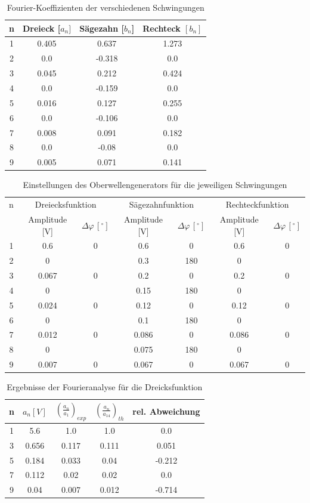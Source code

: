 \documentclass[11pt,ngerman,a4paper]{article}
\begin{document}
\newpage
\begin{table}
\centering
\begin{tabular}{|c|c|c|c|}

\hline
n & Dreieck [$a_n]$ & S\"agezahn [$b_n$] & Rechteck $[b_n]$ \\
\hline
1 & 0.405 & 0.637 & 1.273\\
2 & 0.0 & -0.318 & 0.0\\
3 & 0.045 & 0.212 & 0.424\\
4 & 0.0 & -0.159 & 0.0\\
5 & 0.016 & 0.127 & 0.255\\
6 & 0.0 & -0.106 & 0.0\\
7 & 0.008 & 0.091 & 0.182\\
8 & 0.0 & -0.08 & 0.0\\
9 & 0.005 & 0.071 & 0.141\\
\hline
\end{tabular}
\label{table1}
\caption{Fourier-Koeffizienten der verschiedenen Schwingungen}
\end{table}

\begin{table}
\centering
\begin{tabular}{|c||c|c||c|c||c|c|}
\hline
n & \multicolumn{2}{c||}{Dreiecksfunktion} & \multicolumn{2}{c||}{Sägezahnfunktion} & \multicolumn{2}{c|}{Rechteckfunktion} \\
 & Amplitude [V] & $\Delta \varphi\,[^\circ]$ & Amplitude [V] & $\Delta \varphi\,[^\circ]$ & Amplitude [V] & $\Delta \varphi\,[^\circ]$ \\
\hline
1 & 0.6 & 0 & 0.6 & 0 & 0.6 & 0\\
2 & 0 &  & 0.3 & 180 & 0& \\
3 & 0.067 & 0 & 0.2 & 0 & 0.2 & 0\\
4 & 0 &  & 0.15 & 180 & 0 & \\
5 & 0.024 & 0 & 0.12 & 0 & 0.12 & 0\\
6 & 0 &  & 0.1 & 180 & 0 & \\
7 & 0.012 & 0 & 0.086 & 0 & 0.086 & 0\\
8 & 0 &  & 0.075 & 180 & 0 & \\
9 & 0.007 & 0 & 0.067 & 0 & 0.067 & 0\\
\hline
\end{tabular}
\label{params}
\caption{Einstellungen des Oberwellengenerators für die jeweiligen Schwingungen}
\end{table}
\begin{table}
\centering
\begin{tabular}{|c|c|c|c|c|}
\hline
n & $a_n [V]$ & $(\frac{a_n}{a_1})_{exp}$ & $(\frac{a_n}{a_14})_{th}$ & rel. Abweichung\\
\hline
1&5.6 & 1.0 & 1.0 & 0.0\\
3&0.656 & 0.117 & 0.111 & 0.051\\
5&0.184 & 0.033 & 0.04 & -0.212\\
7&0.112 & 0.02 & 0.02 & 0.0\\
9&0.04 & 0.007 & 0.012 & -0.714\\
\hline
\end{tabular}
\label{hut}
\caption{Ergebnisse der Fourieranalyse für die Dreicksfunktion}
\end{table}
\end{document}
